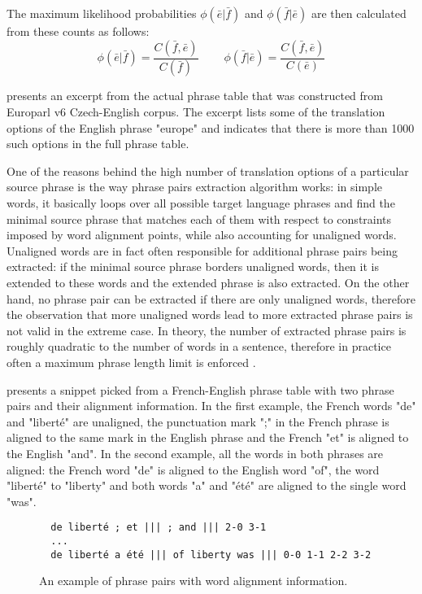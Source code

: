 The maximum likelihood probabilities $\phi(\bar{e}|\bar{f})$ and
$\phi(\bar{f}|\bar{e})$ are then calculated from these counts as follows:
\begin{equation}
  \phi(\bar{e}|\bar{f}) = \frac{C(\bar{f},\bar{e})}{C(\bar{f})}
  ~~~~~~~~~~ %
  \phi(\bar{f}|\bar{e}) = \frac{C(\bar{f},\bar{e})}{C(\bar{e})}
\end{equation}

 presents an excerpt from the actual phrase table
that was constructed from Europarl v6 Czech-English corpus.
The excerpt lists some of the translation options of the English phrase "europe" and
indicates that there is more than 1000 such options in the full phrase table.

One of the reasons behind the high number of translation options of a particular
source phrase is the way phrase pairs extraction algorithm works:
in simple words, it basically loops over all possible target language phrases
and find the minimal source phrase that matches each of them with respect to
constraints imposed by word alignment points, while also accounting for
unaligned words.
Unaligned words are in fact often responsible for additional phrase pairs
being extracted: if the minimal source phrase borders unaligned words,
then it is extended to these words and the extended phrase is also extracted.
On the other hand, no phrase pair can be extracted if there are only unaligned
words, therefore the observation that more unaligned words lead to more
extracted phrase pairs is not valid in the extreme case.
In theory, the number of extracted phrase pairs is roughly quadratic to the number
of words in a sentence, therefore in practice often a maximum phrase length limit
is enforced \citep[Chapter 5.2]{koehn:smt}.

 presents a snippet picked from a French-English
phrase table with two phrase pairs and their alignment information.
In the first example, the French words "de" and "liberté" are unaligned,
the punctuation mark ";" in the French phrase is aligned to the same mark in the English phrase
and the French "et" is aligned to the English "and".
In the second example, all the words in both phrases are aligned:
the French word "de" is aligned to the English word "of", the word "liberté" to "liberty"
and both words "a" and "été" are aligned to the single word "was".

\begin{figure}[ht]
\begin{verbatim}
  de liberté ; et ||| ; and ||| 2-0 3-1
  ...
  de liberté a été ||| of liberty was ||| 0-0 1-1 2-2 3-2
\end{verbatim}
\caption{\label{fig:phrase-pair-alignment}
An example of phrase pairs with word alignment information.}
\end{figure}

